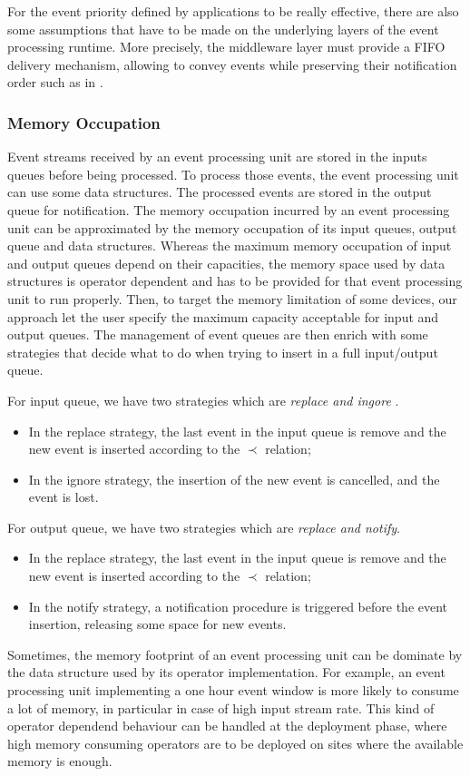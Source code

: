\documentclass[a4paper,twoside]{article}
\begin{document}
For the event priority defined by applications to be really effective, there are also some assumptions that have to be made on the underlying layers of the event processing runtime. More precisely, the middleware layer must provide a FIFO delivery mechanism, allowing to convey events while preserving their notification order such as in \cite{Chockler2001,Malekpour2011}.
\subsubsection{Memory Occupation}
Event streams received by an event processing unit are stored in the inputs queues before being processed. To process those events, the event processing unit can use some data structures. The processed events are stored in the output queue for notification. The memory occupation incurred by an event processing unit can be approximated by the memory occupation of its input queues, output queue and data structures. Whereas the maximum memory occupation of input and output queues depend on their capacities, the memory space used by data structures is operator dependent and has to be provided for that event processing unit to run properly. Then, to target the memory limitation of some devices, our approach let the user specify the maximum capacity acceptable for input and output queues. The management of event queues are then enrich with some strategies that decide what to do when trying to insert in a full input/output queue.

For input queue, we have two strategies which are \textit{replace and ingore }.
\begin{itemize}
\item In the replace strategy, the last event in the input queue is remove and the new event is inserted according to the $\prec$ relation;
\item In the ignore strategy, the insertion of the new event is cancelled, and the event is lost.
\end{itemize} 

For output queue, we have two strategies which are \textit{replace and notify}.
\begin{itemize}
\item In the replace strategy, the last event in the input queue is remove and the new event is inserted according to the $\prec$ relation;
\item In the notify strategy, a notification procedure is triggered before the event insertion, releasing some space for new events. 
\end{itemize} 
Sometimes, the memory footprint of an event processing unit can be dominate by the data structure used by its operator implementation. For example, an event processing unit implementing a one hour event window is more likely to consume a lot of memory, in particular in case of high input stream rate. This kind of operator dependend behaviour can be handled at the deployment phase, where high memory consuming operators are to be deployed on sites where the available memory is enough.    
\end{document}
